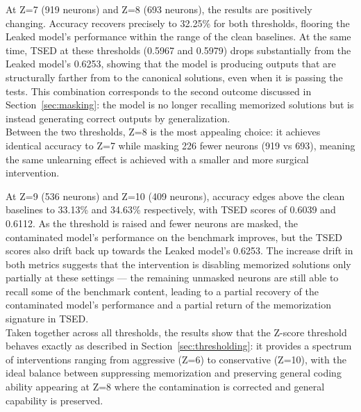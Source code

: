 \documentclass[mscthesis]{usiinfthesis}
\begin{document}
At Z=7 (919 neurons) and Z=8 (693 neurons), the results are positively changing.
Accuracy recovers precisely to 32.25\% for both thresholds, flooring the Leaked model's performance within the range  of the clean
baselines. At the same time, TSED at these thresholds (0.5967 and 0.5979) drops
substantially from the Leaked model's 0.6253, showing that the model is producing outputs that are structurally farther from to the canonical solutions, even when it is passing the tests.
This combination corresponds to the second outcome discussed in Section~\ref{sec:masking}: the model is no longer recalling memorized solutions but
is instead generating correct outputs by generalization. \\
Between the two thresholds, Z=8 is the most appealing choice:
it achieves identical accuracy to Z=7 while masking 226 fewer neurons (919 vs 693), meaning the same unlearning effect is achieved with a smaller and more surgical intervention.
\par\vspace{1em} 
At Z=9 (536 neurons) and Z=10 (409 neurons), accuracy edges above the clean baselines
to 33.13\% and 34.63\% respectively, with TSED scores of 0.6039 and 0.6112. 
As the threshold is raised and fewer neurons are masked, the contaminated model's performance on the benchmark improves, but the TSED scores also drift back up towards the Leaked model's 0.6253.
The increase drift in both metrics suggests that the intervention is disabling memorized solutions only partially at these settings --- the remaining unmasked neurons are still able to recall some of the benchmark content, leading to a partial recovery of the contaminated model's performance and a partial return of the memorization signature in TSED. \\
Taken together across all thresholds, the results show that the Z-score threshold behaves exactly as described in Section~\ref{sec:thresholding}: it
provides a spectrum of interventions ranging from aggressive (Z=6) to conservative (Z=10), with the ideal balance between suppressing memorization and preserving general coding ability appearing
at Z=8 where the contamination is corrected and general capability is preserved.
\end{document}
